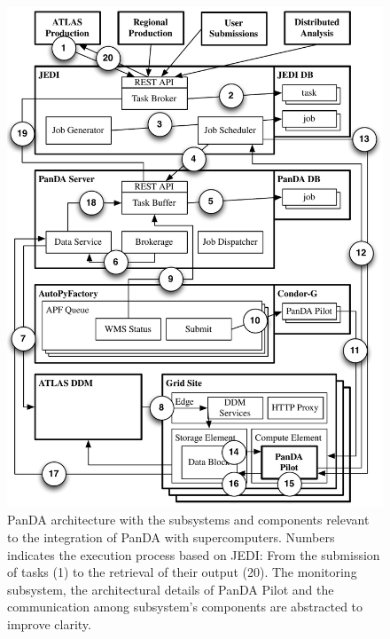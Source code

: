 \begin{figure}
  \begin{center}
    \includegraphics[width=\columnwidth]{figures/panda_architecture.pdf}
  \end{center}
    \caption{PanDA architecture with the subsystems and components
    relevant to the integration of PanDA with supercomputers. Numbers indicates
    the execution process based on JEDI: From the submission of tasks (1) to the
    retrieval of their output (20). The monitoring subsystem, the architectural
    details of PanDA Pilot and the communication among subsystem's components
    are abstracted to improve clarity.}
\label{fig:architecture}
\end{figure}


